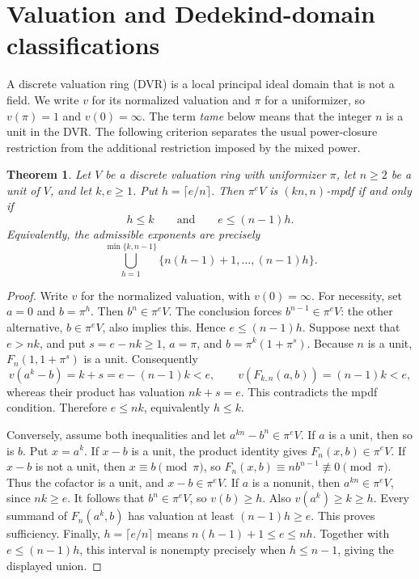 \documentclass[11pt,a4paper]{amsart}
\newtheorem{theorem}{Theorem}[section]
\theoremstyle{definition}
\theoremstyle{remark}
\numberwithin{equation}{section}
\begin{document}
\section{Valuation and Dedekind-domain classifications}\label{sec:valuation}

A discrete valuation ring (DVR) is a local principal ideal domain that
is not a field. We write $v$ for its normalized valuation and $\pi$
for a uniformizer, so $v(\pi)=1$ and $v(0)=\infty$.
The term \emph{tame} below means that the integer $n$ is a unit in the
DVR. The following criterion separates the usual power-closure
restriction from the additional restriction imposed by the mixed power.

\begin{theorem} \label{thm:tame-dvr}
Let $V$ be a discrete valuation ring with uniformizer $\pi$, let $n\ge2$
be a unit of $V$, and let $k,e\ge1$. Put $h=\lceil e/n\rceil$.
Then $\pi^eV$ is $(kn,n)$-mpdf if and only if
\[
 h\le k\qquad\text{and}\qquad e\le(n-1)h.
\]
Equivalently, the admissible exponents are precisely
\[
 \bigcup_{h=1}^{\min\{k,n-1\}}
 \{n(h-1)+1,\ldots,(n-1)h\}.
\]
\end{theorem}
\begin{proof}
Write $v$ for the normalized valuation, with $v(0)=\infty$.
For necessity, set $a=0$ and $b=\pi^h$. Then $b^n\in\pi^eV$.
The conclusion forces $b^{n-1}\in\pi^eV$: the other alternative,
$b\in\pi^eV$, also implies this. Hence $e\le(n-1)h$.
Suppose next that $e>nk$, and put $s=e-nk\ge1$,
$a=\pi$, and $b=\pi^k(1+\pi^s)$. Because $n$ is a unit,
$F_n(1,1+\pi^s)$ is a unit. Consequently
\[
 v(a^k-b)=k+s=e-(n-1)k<e,
 \qquad v(F_{k,n}(a,b))=(n-1)k<e,
\]
whereas their product has valuation $nk+s=e$. This contradicts the
mpdf condition. Therefore $e\le nk$, equivalently $h\le k$.

Conversely, assume both inequalities and let $a^{kn}-b^n\in\pi^eV$.
If $a$ is a unit, then so is $b$. Put $x=a^k$. If $x-b$ is a unit,
the product identity gives $F_n(x,b)\in\pi^eV$. If $x-b$ is not a
unit, then $x\equiv b\pmod\pi$, so
$F_n(x,b)\equiv nb^{n-1}\not\equiv0\pmod\pi$. Thus the cofactor is a
unit, and $x-b\in\pi^eV$.
If $a$ is a nonunit, then $a^{kn}\in\pi^eV$, since $nk\ge e$.
It follows that $b^n\in\pi^eV$, so $v(b)\ge h$. Also $v(a^k)\ge k\ge h$.
Every summand of $F_n(a^k,b)$ has valuation at least $(n-1)h\ge e$.
This proves sufficiency.
Finally, $h=\lceil e/n\rceil$ means $n(h-1)+1\le e\le nh$.
Together with $e\le(n-1)h$, this interval is nonempty precisely when
$h\le n-1$, giving the displayed union.
\end{proof}
\end{document}
